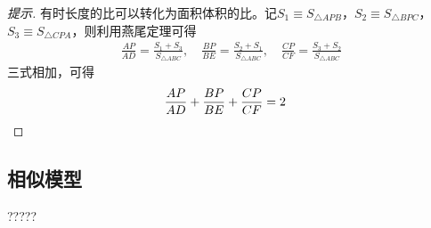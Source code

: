 \begin{proof}[提示]
  有时长度的比可以转化为面积体积的比。记$S_1\equiv S_{\triangle APB}$，$S_2\equiv S_{\triangle BPC}$，$S_3\equiv S_{\triangle CPA}$，则利用燕尾定理可得
  \begin{align*}
    \frac{AP}{AD}={}\frac{S_1 + S_3}{S_{\triangle ABC}},\quad
    \frac{BP}{BE}={}\frac{S_2 + S_1}{S_{\triangle ABC}},\quad
    \frac{CP}{CF}={}\frac{S_3 + S_2}{S_{\triangle ABC}}
  \end{align*}
  三式相加，可得
  \begin{align*}
    \frac{AP}{AD} + \frac{BP}{BE} + \frac{CP}{CF} = 2&\qedhere
  \end{align*}
\end{proof}

\subsection{相似模型}
\label{sec:similar-model}

?????